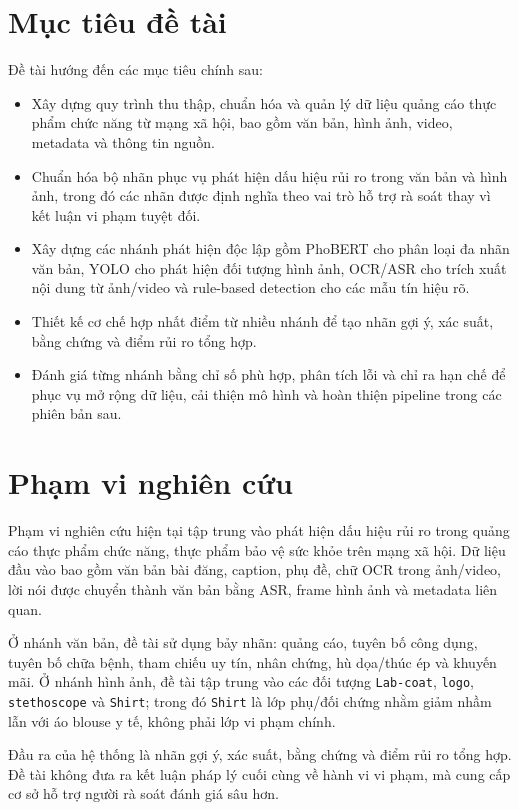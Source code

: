 \section{Mục tiêu đề tài}
Đề tài hướng đến các mục tiêu chính sau:
\begin{itemize}
    \item Xây dựng quy trình thu thập, chuẩn hóa và quản lý dữ liệu quảng cáo thực phẩm chức năng từ mạng xã hội, bao gồm văn bản, hình ảnh, video, metadata và thông tin nguồn.
    \item Chuẩn hóa bộ nhãn phục vụ phát hiện dấu hiệu rủi ro trong văn bản và hình ảnh, trong đó các nhãn được định nghĩa theo vai trò hỗ trợ rà soát thay vì kết luận vi phạm tuyệt đối.
    \item Xây dựng các nhánh phát hiện độc lập gồm PhoBERT cho phân loại đa nhãn văn bản, YOLO cho phát hiện đối tượng hình ảnh, OCR/ASR cho trích xuất nội dung từ ảnh/video và rule-based detection cho các mẫu tín hiệu rõ.
    \item Thiết kế cơ chế hợp nhất điểm từ nhiều nhánh để tạo nhãn gợi ý, xác suất, bằng chứng và điểm rủi ro tổng hợp.
    \item Đánh giá từng nhánh bằng chỉ số phù hợp, phân tích lỗi và chỉ ra hạn chế để phục vụ mở rộng dữ liệu, cải thiện mô hình và hoàn thiện pipeline trong các phiên bản sau.
\end{itemize}

\section{Phạm vi nghiên cứu}
Phạm vi nghiên cứu hiện tại tập trung vào phát hiện dấu hiệu rủi ro trong quảng cáo thực phẩm chức năng, thực phẩm bảo vệ sức khỏe trên mạng xã hội. Dữ liệu đầu vào bao gồm văn bản bài đăng, caption, phụ đề, chữ OCR trong ảnh/video, lời nói được chuyển thành văn bản bằng ASR, frame hình ảnh và metadata liên quan.

Ở nhánh văn bản, đề tài sử dụng bảy nhãn: quảng cáo, tuyên bố công dụng, tuyên bố chữa bệnh, tham chiếu uy tín, nhân chứng, hù dọa/thúc ép và khuyến mãi. Ở nhánh hình ảnh, đề tài tập trung vào các đối tượng \texttt{Lab-coat}, \texttt{logo}, \texttt{stethoscope} và \texttt{Shirt}; trong đó \texttt{Shirt} là lớp phụ/đối chứng nhằm giảm nhầm lẫn với áo blouse y tế, không phải lớp vi phạm chính.

Đầu ra của hệ thống là nhãn gợi ý, xác suất, bằng chứng và điểm rủi ro tổng hợp. Đề tài không đưa ra kết luận pháp lý cuối cùng về hành vi vi phạm, mà cung cấp cơ sở hỗ trợ người rà soát đánh giá sâu hơn.

